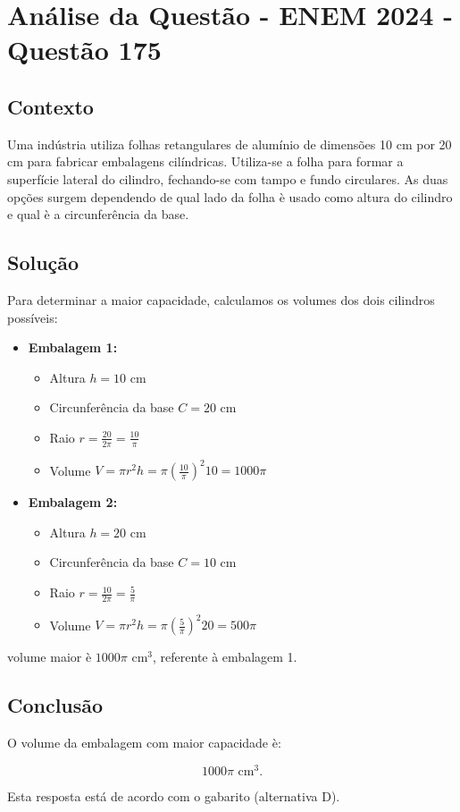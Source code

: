 \documentclass{article}
\begin{document}
\section*{Análise da Questão - ENEM 2024 - Questão 175}

\subsection*{Contexto}
Uma indústria utiliza folhas retangulares de alumínio de dimensões 10 cm por 20 cm para fabricar embalagens cilíndricas. Utiliza-se a folha para formar a superfície lateral do cilindro, fechando-se com tampo e fundo circulares. As duas opções surgem dependendo de qual lado da folha è usado como altura do cilindro e qual è a circunferência da base.

\subsection*{Solução}
Para determinar a maior capacidade, calculamos os volumes dos dois cilindros possíveis:

\begin{itemize}
  \item \textbf{Embalagem 1:}
    \begin{itemize}
      \item Altura $h = 10$ cm
      \item Circunferência da base $C=20$ cm
      \item Raio $r = \frac{20}{2\pi} = \frac{10}{\pi}$
      \item Volume $V = \pi r^2 h = \pi \left(\frac{10}{\pi}\right)^2 10 = 1000 \pi$
    \end{itemize}
  \item \textbf{Embalagem 2:}
    \begin{itemize}
      \item Altura $h = 20$ cm
      \item Circunferência da base $C=10$ cm
      \item Raio $r = \frac{10}{2\pi} = \frac{5}{\pi}$
      \item Volume $V = \pi r^2 h = \pi \left(\frac{5}{\pi}\right)^2 20 = 500 \pi$
    \end{itemize}
\end{itemize}

\no volume maior è $1000\pi$ cm$^3$, referente à embalagem 1.

\subsection*{Conclusão}
O volume da embalagem com maior capacidade è:

\[
\boxed{1000 \pi \text{ cm}^3}.
\]

Esta resposta está de acordo com o gabarito (alternativa D).
\end{document}
